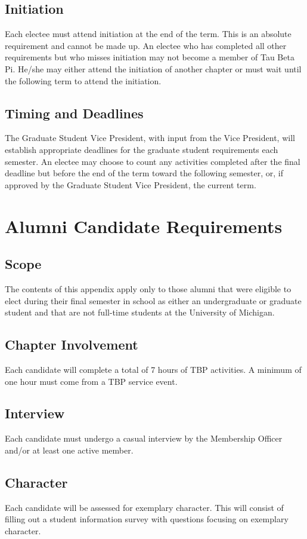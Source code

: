 \section{Initiation}	Each electee must attend initiation at the end of the term. This is an absolute requirement and cannot be made up. An electee who has completed all other requirements but who misses initiation may not become a member of Tau Beta Pi. He/she may either attend the initiation of another chapter or must wait until the following term to attend the initiation.  
\section{Timing and Deadlines}  The Graduate Student Vice President, with input from the Vice President, will establish appropriate deadlines for the graduate student requirements each semester. An electee may choose to count any activities completed after the final deadline but before the end of the term toward the following semester, or, if approved by the Graduate Student Vice President, the current term.

\chapter{Alumni Candidate Requirements}\label{sec:alumnireqs}%
\section{Scope} The contents of this appendix apply only to those alumni that were eligible to elect during their final semester in school as either an undergraduate or graduate student and that are not full-time students at the  University of Michigan.
\section{Chapter Involvement} Each candidate will complete a total of 7 hours of TBP activities. A minimum of one hour must come from a TBP service event.
\section{Interview} Each candidate must undergo a casual interview by the Membership Officer and/or at least one active member. 
\section{Character} Each candidate will be assessed for exemplary character. This will consist of filling out a student information survey with questions focusing on exemplary character.

